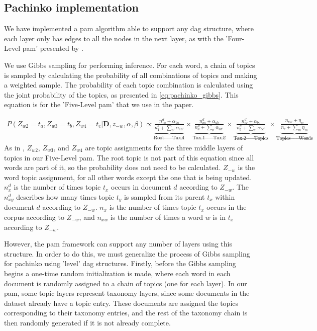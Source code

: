 \subsection{Pachinko implementation}\label{sec:pam_gibbs}
We have implemented a \acrfull{pam} algorithm able to support any \gls{dag} structure, where each layer only has edges to all the nodes in the next layer, as with the 'Four-Level \gls{pam}' presented by \citet{li2006pachinko}.

We use Gibbs sampling for performing inference.
For each word, a chain of topics is sampled by calculating the probability of all combinations of topics and making a weighted sample.
The probability of each topic combination is calculated using the joint probability of the topics, as presented in \autoref{eq:pachinko_gibbs}. This equation is for the 'Five-Level \gls{pam}' that we use in the paper.

\begin{equation}\label{eq:pachinko_gibbs}
	\begin{split}
		P(Z_{w2} = t_a, Z_{w3} = t_b, Z_{w4} = t_c | \textbf{D}, z_{-w}, \alpha, \beta) \propto
		\underbrace{\frac{n_{1a}^d + \alpha_{1a}}{n_1^d + \sum_{a'} \alpha_{1a'}}}_{\text{Root $\rightarrow$ Tax.1}} \times
		\underbrace{\frac{n_{ab}^d + \alpha_{ab}}{n_a^d + \sum_{b'} \alpha_{ab'}}}_{\text{Tax.1 $\rightarrow$ Tax.2}}  \times 
		\underbrace{\frac{n_{bc}^d + \alpha_{bc}}{n_{b}^d + \sum_{c'} \alpha_{bc'}}}_{\text{Tax.2 $\rightarrow$ Topics}} \times 
		\underbrace{\frac{n_{cw} + \eta_{w}}{n_{c} + \sum_{m} \eta_{m}}}_{\text{Topics $\rightarrow$ Words}} 
	\end{split}
\end{equation}
As in \citet{li2006pachinko}, $Z_{w2}$, $Z_{w3}$, and $Z_{w4}$ are topic assignments for the three middle layers of topics in our Five-Level \gls{pam}.
The root topic is not part of this equation since all words are part of it, so the probability does not need to be calculated.
$Z_{-w}$ is the word topic assignment, for all other words except the one that is being updated.
$n_x^d$ is the number of times topic $t_x$ occurs in document $d$ according to $Z_{-w}$. 
The $n_{xy}^d$ describes how many times topic $t_y$ is sampled from its parent $t_x$ within document $d$ according to $Z_{-w}$.
$n_x$ is the number of times topic $t_x$ occurs in the corpus according to $Z_{-w}$, and $n_{xw}$ is the number of times a word $w$ is in $t_x$ according to $Z_{-w}$.

However, the \gls{pam} framework can support any number of layers using this structure.
In order to do this, we must generalize the process of Gibbs sampling for pachinko using 'level' \gls{dag} structures.
Firstly, before the Gibbs sampling begins a one-time random initialization is made, where each word in each document is randomly assigned to a chain of topics (one for each layer).
In our \gls{pam}, some topic layers represent taxonomy layers, since some documents in the dataset already have a topic entry.
These documents are assigned the topics corresponding to their taxonomy entries, and the rest of the taxonomy chain is then randomly generated if it is not already complete.

